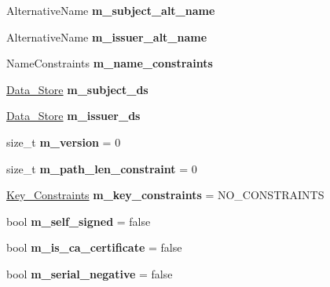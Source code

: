 \begin{DoxyCompactItemize}
Alternative\+Name {\bfseries m\+\_\+subject\+\_\+alt\+\_\+name}
\item 
\mbox{\label{struct_botan_1_1_x509___certificate___data_a80d49600f8504f997d40928cbcd4c521}} 
Alternative\+Name {\bfseries m\+\_\+issuer\+\_\+alt\+\_\+name}
\item 
\mbox{\label{struct_botan_1_1_x509___certificate___data_a6c94ba608146ccfd454f6ec17c9f57b8}} 
Name\+Constraints {\bfseries m\+\_\+name\+\_\+constraints}
\item 
\mbox{\label{struct_botan_1_1_x509___certificate___data_ac588b91530ae996e53096723c0c13d1a}} 
\mbox{\hyperlink{class_botan_1_1_data___store}{Data\+\_\+\+Store}} {\bfseries m\+\_\+subject\+\_\+ds}
\item 
\mbox{\label{struct_botan_1_1_x509___certificate___data_a9d69e064ebc556e35060a065cf3a5b54}} 
\mbox{\hyperlink{class_botan_1_1_data___store}{Data\+\_\+\+Store}} {\bfseries m\+\_\+issuer\+\_\+ds}
\item 
\mbox{\label{struct_botan_1_1_x509___certificate___data_a75e60022c076305893f8a69f7ac6bc01}} 
size\+\_\+t {\bfseries m\+\_\+version} = 0
\item 
\mbox{\label{struct_botan_1_1_x509___certificate___data_ad576f1a69da02e1bfd67971891e92809}} 
size\+\_\+t {\bfseries m\+\_\+path\+\_\+len\+\_\+constraint} = 0
\item 
\mbox{\label{struct_botan_1_1_x509___certificate___data_a92ece94cc0b6544e38ea7e67ea039d11}} 
\mbox{\hyperlink{namespace_botan_aed0885e5c70627dd43827b966e727654}{Key\+\_\+\+Constraints}} {\bfseries m\+\_\+key\+\_\+constraints} = N\+O\+\_\+\+C\+O\+N\+S\+T\+R\+A\+I\+N\+TS
\item 
\mbox{\label{struct_botan_1_1_x509___certificate___data_a96c142a3b758be72ed09a258430c0a60}} 
bool {\bfseries m\+\_\+self\+\_\+signed} = false
\item 
\mbox{\label{struct_botan_1_1_x509___certificate___data_a0a2bc122358a0e43de017a30417a77d1}} 
bool {\bfseries m\+\_\+is\+\_\+ca\+\_\+certificate} = false
\item 
\mbox{\label{struct_botan_1_1_x509___certificate___data_ad80977ebc54c0449106e00ffb64bfb41}} 
bool {\bfseries m\+\_\+serial\+\_\+negative} = false
\end{DoxyCompactItemize}


